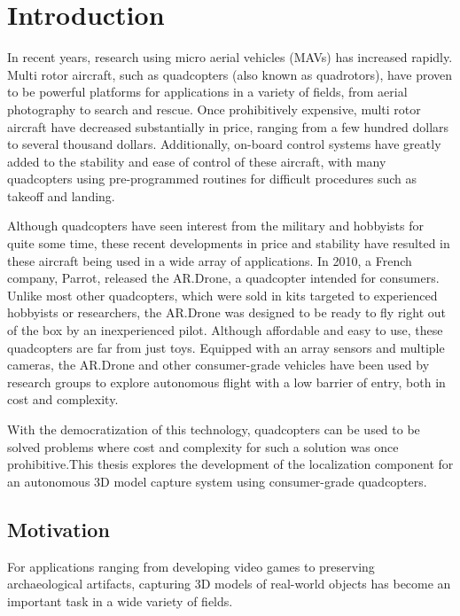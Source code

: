 
\chapter{Introduction\label{ch:intro}}

In recent years, research using micro aerial vehicles (MAVs) has increased rapidly. Multi rotor aircraft, such as quadcopters (also known as quadrotors), have proven to be powerful platforms for applications in a variety of fields, from aerial photography to search and rescue.\cite{} Once prohibitively expensive, multi rotor aircraft have decreased substantially in price, ranging from a few hundred dollars to several thousand dollars. Additionally, on-board control systems have greatly added to the stability and ease of control of these aircraft, with many quadcopters using pre-programmed routines for difficult procedures such as takeoff and landing.


Although quadcopters have seen interest from the military and hobbyists for quite some time, these recent developments in price and stability have resulted in these aircraft being used in a wide array of applications. In 2010, a French company, Parrot, released the AR.Drone, a quadcopter intended for consumers. Unlike most other quadcopters, which were sold in kits targeted to experienced hobbyists or researchers, the AR.Drone was designed to be ready to fly right out of the box by an inexperienced pilot. Although affordable and easy to use, these quadcopters are far from just toys. Equipped with an array sensors and multiple cameras, the AR.Drone and other consumer-grade vehicles have been used by research groups to explore autonomous flight with a low barrier of entry, both in cost and complexity.

With the democratization of this technology, quadcopters can be used to be solved problems where cost and complexity for such a solution was once prohibitive.This thesis explores the development of the localization component for an autonomous 3D model capture system using consumer-grade quadcopters.

\section{Motivation}

For applications ranging from developing video games to preserving archaeological artifacts, capturing 3D models of real-world objects has become an important task in a wide variety of fields. %

